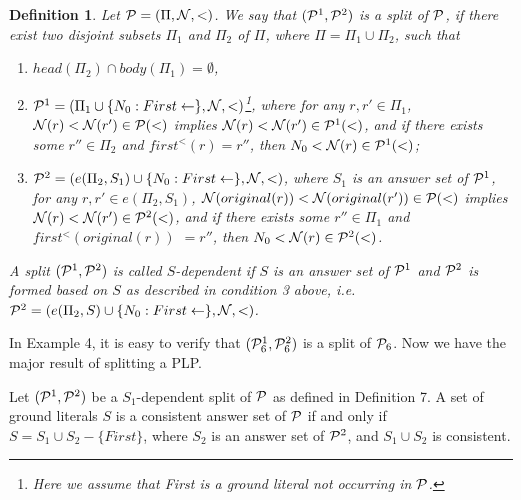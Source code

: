 \documentclass{tlp}
\newtheorem{definition}{Definition} %
\begin{document}
\begin{definition}
Let ${\cal P}=(\Pi, {\cal N},<)$. We say that $({\cal P}^{1}, {\cal P}^{2})$ is
a {\em split} of ${\cal P}$, if there exist two disjoint
subsets $\Pi_{1}$ and $\Pi_{2}$ of
$\Pi$, where $\Pi=\Pi_{1}\cup\Pi_{2}$,  such that
\begin{enumerate}
\item $head(\Pi_{2})\cap body(\Pi_{1})=\emptyset$,
%
\item ${\cal P}^{1}=(\Pi_{1}\cup\{N_{0}: First\leftarrow\}, {\cal N},<)$\footnote{Here
we assume that {\em First} is a ground literal not occurring in ${\cal P}$.}, where
for any $r, r'\in \Pi_{1}$, ${\cal N}(r)<{\cal N}(r')\in {\cal P}(<)$ implies
${\cal N}(r)<{\cal N}(r')\in {\cal P}^{1}(<)$, and if there exists some
$r''\in \Pi_{2}$ and $first^{<}(r)=r''$, then $N_{0}<{\cal N}(r)\in {\cal P}^{1}(<)$;
%
\item ${\cal P}^{2}=(e(\Pi_{2},S_{1})\cup\{N_{0}: First\leftarrow\}, {\cal N},<)$, where
$S_{1}$ is an answer set of ${\cal P}^{1}$,
for any $r, r'\in e(\Pi_{2},S_{1})$,
${\cal N}(original(r))<{\cal N}(original(r'))\in {\cal P}(<)$ implies
${\cal N}(r)<{\cal N}(r')\in {\cal P}^{2}(<)$, and if there exists some
$r''\in \Pi_{1}$ and $first^{<}(original(r))$ $=r''$,
then $N_{0}<{\cal N}(r)\in {\cal P}^{2}(<)$.
\end{enumerate}
A split $({\cal P}^{1}, {\cal P}^{2})$ is called $S$-{\em dependent} if
$S$ is an answer set of ${\cal P}^{1}$ and ${\cal P}^{2}$ is formed based on
$S$ as described in condition 3 above,
i.e. ${\cal P}^{2}=(e(\Pi_{2},S)\cup\{N_{0}: First\leftarrow\}, {\cal N},<)$.
\end{definition}

In Example 4, it is easy to verify that
$({\cal P}_{6}^{1},{\cal P}_{6}^{2})$ is a split of ${\cal P}_{6}$.
Now we have the major result of splitting a PLP.

\begin{theorem}
Let $({\cal P}^{1}, {\cal P}^{2})$ be a $S_1$-dependent split of 
${\cal P}$ as defined in Definition 7.  A set of ground literals $S$
is a consistent answer set of ${\cal P}$ if and only if
$S=S_{1}\cup S_{2}-\{First\}$, where 
$S_{2}$ is an answer set of ${\cal P}^{2}$, and
$S_{1}\cup S_{2}$ is consistent.
\end{theorem}
\end{document}
